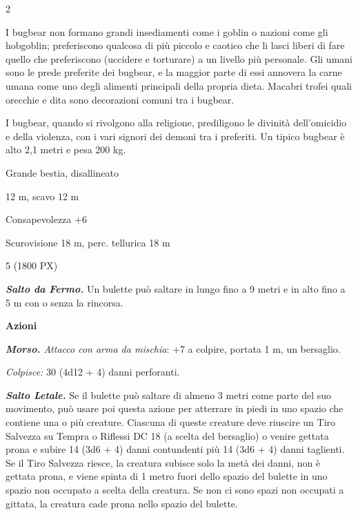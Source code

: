 \begin{multicols}{2}
{I bugbear non formano grandi insediamenti come i goblin o nazioni come gli hobgoblin; preferiscono qualcosa di più piccolo e caotico che li lasci liberi di fare quello che preferiscono (uccidere e torturare) a un livello più personale. Gli umani sono le prede preferite dei bugbear, e la maggior parte di essi annovera la carne umana come uno degli alimenti principali della propria dieta. Macabri trofei quali orecchie e dita sono decorazioni comuni tra i bugbear.

I bugbear, quando si rivolgono alla religione, prediligono le divinità dell'omicidio e della violenza, con i vari signori dei demoni tra i preferiti. Un tipico bugbear è alto 2,1 metri e pesa 200 kg.

\begin{description}[noitemsep, topsep=0pt, parsep=0pt, partopsep=0pt, itemsep=1pt, leftmargin=2.35cm,  labelwidth=2.2cm, itemindent=0cm, listparindent=0pt] %
\setlength{\baselineskip}{10pt}
\item[\textbf{Taglia/Tipo}] Grande bestia, disallineato
\item[\textbf{Caratt.}] 
\item[\textbf{Punti Ferita}] 
\item[\textbf{Movimento}] 12 m, scavo 12 m
\item[\textbf{Tiri Salvez.}] 
\item[\textbf{Comp.}] Consapevolezza +6
\item[\textbf{Sensi}] Scurovisione 18 m, perc. tellurica 18 m
\item[\textbf{Sfida}] 5 (1800 PX)
\end{description}
\smallskip

\emph{\textbf{Salto da Fermo.}} Un bulette può saltare in lungo fino a 9 metri e in alto fino a 5 m con o senza la rincorsa.

\textbf{Azioni}

\emph{\textbf{Morso.} Attacco con arma da mischia}: +7 a colpire, portata 1 m, un bersaglio.

\emph{Colpisce:} 30 (4d12 + 4) danni perforanti.

\emph{\textbf{Salto Letale.}} Se il bulette può saltare di almeno 3 metri come parte del suo movimento, può usare poi questa azione per atterrare in piedi in uno spazio che contiene una o più creature. Ciascuna di queste creature deve riuscire un Tiro Salvezza su Tempra o Riflessi DC 18 (a scelta del bersaglio) o venire gettata prona e subire 14 (3d6 + 4) danni contundenti più 14 (3d6 + 4) danni taglienti. Se il Tiro Salvezza riesce, la creatura subisce solo la metà dei danni, non è gettata prona, e viene spinta di 1 metro fuori dello spazio del bulette in uno spazio non occupato a scelta della creatura. Se non ci sono spazi non occupati a gittata, la creatura cade prona nello spazio del bulette.

}
\end{multicols}
